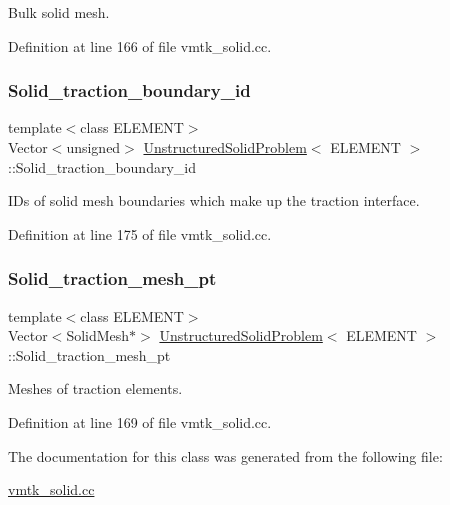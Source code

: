 Bulk solid mesh. 



Definition at line 166 of file vmtk\+\_\+solid.\+cc.

\mbox{\label{classUnstructuredSolidProblem_a4cf906bac719c9a942c04bda2798080f}} 
\subsubsection{\texorpdfstring{Solid\+\_\+traction\+\_\+boundary\+\_\+id}{Solid\_traction\_boundary\_id}}
{\footnotesize\ttfamily template$<$class E\+L\+E\+M\+E\+NT$>$ \\
Vector$<$unsigned$>$ \hyperlink{classUnstructuredSolidProblem}{Unstructured\+Solid\+Problem}$<$ E\+L\+E\+M\+E\+NT $>$\+::Solid\+\_\+traction\+\_\+boundary\+\_\+id\hspace{0.3cm}{\ttfamily [private]}}



I\+Ds of solid mesh boundaries which make up the traction interface. 



Definition at line 175 of file vmtk\+\_\+solid.\+cc.

\mbox{\label{classUnstructuredSolidProblem_a32e691a698667053003e21333fc65057}} 
\subsubsection{\texorpdfstring{Solid\+\_\+traction\+\_\+mesh\+\_\+pt}{Solid\_traction\_mesh\_pt}}
{\footnotesize\ttfamily template$<$class E\+L\+E\+M\+E\+NT$>$ \\
Vector$<$Solid\+Mesh$\ast$$>$ \hyperlink{classUnstructuredSolidProblem}{Unstructured\+Solid\+Problem}$<$ E\+L\+E\+M\+E\+NT $>$\+::Solid\+\_\+traction\+\_\+mesh\+\_\+pt\hspace{0.3cm}{\ttfamily [private]}}



Meshes of traction elements. 



Definition at line 169 of file vmtk\+\_\+solid.\+cc.



The documentation for this class was generated from the following file\+:\begin{DoxyCompactItemize}
\item 
\hyperlink{vmtk__solid_8cc}{vmtk\+\_\+solid.\+cc}\end{DoxyCompactItemize}
